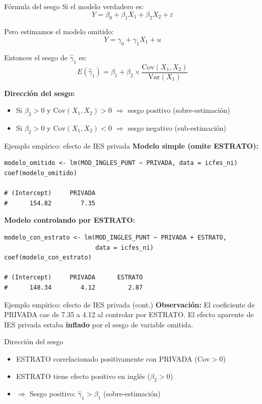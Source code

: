 \documentclass[aspectratio=169, 11pt]{beamer}
\begin{document}
\begin{frame}{Fórmula del sesgo}
Si el modelo verdadero es:
\[
Y = \beta_0 + \beta_1 X_1 + \beta_2 X_2 + \varepsilon
\]

Pero estimamos el modelo omitido:
\[
Y = \gamma_0 + \gamma_1 X_1 + u
\]

Entonces el sesgo de $\hat{\gamma}_1$ es:
\[
E(\hat{\gamma}_1) = \beta_1 + \beta_2 \times \frac{\text{Cov}(X_1, X_2)}{\text{Var}(X_1)}
\]

\vspace{0.2cm}
\textbf{Dirección del sesgo:}
\begin{itemize}
  \item Si $\beta_2 > 0$ y $\text{Cov}(X_1, X_2) > 0$ $\Rightarrow$ sesgo positivo (sobre-estimación)
  \item Si $\beta_2 > 0$ y $\text{Cov}(X_1, X_2) < 0$ $\Rightarrow$ sesgo negativo (sub-estimación)
\end{itemize}
\end{frame}

\begin{frame}[fragile]{Ejemplo emp\'irico: efecto de IES privada}
\textbf{Modelo simple (omite ESTRATO):}
\begin{lstlisting}
modelo_omitido <- lm(MOD_INGLES_PUNT ~ PRIVADA, data = icfes_ni)
coef(modelo_omitido)

# (Intercept)     PRIVADA
#      154.82        7.35
\end{lstlisting}

\vspace{0.2cm}
\textbf{Modelo controlando por ESTRATO:}
\begin{lstlisting}
modelo_con_estrato <- lm(MOD_INGLES_PUNT ~ PRIVADA + ESTRATO,
                         data = icfes_ni)
coef(modelo_con_estrato)

# (Intercept)     PRIVADA      ESTRATO
#      148.34        4.12         2.87
\end{lstlisting}
\end{frame}

\begin{frame}{Ejemplo emp\'irico: efecto de IES privada (cont.)}
\textbf{Observaci\'on:} El coeficiente de PRIVADA cae de 7.35 a 4.12 al controlar por ESTRATO. El efecto aparente de IES privada estaba \textbf{inflado} por el sesgo de variable omitida.

\vspace{0.3cm}
\begin{alertblock}{Direcci\'on del sesgo}
\begin{itemize}
  \item ESTRATO correlacionado positivamente con PRIVADA ($\text{Cov} > 0$)
  \item ESTRATO tiene efecto positivo en ingl\'es ($\beta_2 > 0$)
  \item $\Rightarrow$ Sesgo positivo: $\hat{\gamma}_1 > \beta_1$ (sobre-estimaci\'on)
\end{itemize}
\end{alertblock}
\end{frame}
\end{document}
